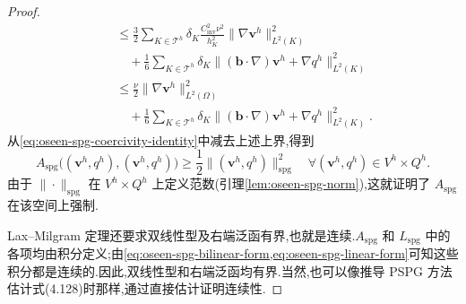 \begin{proof}
\begin{equation}
\begin{aligned}
 &\quad\le \frac{3}{2}\sum_{K\in\mathcal{T}^h}
        \delta_K\frac{C_{\mathrm{inv}}^2\nu^2}{h_K^2}
        \|\nabla\bm{v}^h\|_{L^2(K)}^2\\
 &\qquad+\frac{1}{6}\sum_{K\in\mathcal{T}^h}\delta_K
        \|(\bm{b}\cdot\nabla)\bm{v}^h+\nabla q^h\|_{L^2(K)}^2\\
 &\quad\le \frac{\nu}{2}\|\nabla\bm{v}^h\|_{L^2(\Omega)}^2\\
 &\qquad+\frac{1}{6}\sum_{K\in\mathcal{T}^h}\delta_K
       \|(\bm{b}\cdot\nabla)\bm{v}^h+\nabla q^h\|_{L^2(K)}^2.
\end{aligned}
\end{equation}
从\cref{eq:oseen-spg-coercivity-identity}中减去上述上界,得到
\begin{equation}\label{eq:oseen-spg-coercivity}
 A_{\mathrm{spg}}\bigl((\bm{v}^h,q^h),(\bm{v}^h,q^h)\bigr)
  \ge \frac{1}{2}\|(\bm{v}^h,q^h)\|_{\mathrm{spg}}^2
  \quad\forall(\bm{v}^h,q^h)\in V^h\times Q^h.
\end{equation}
由于 $\|\cdot\|_{\mathrm{spg}}$ 在 $V^h\times Q^h$ 上定义范数(引理\cref{lem:oseen-spg-norm}),这就证明了 $A_{\mathrm{spg}}$ 在该空间上强制.

Lax--Milgram 定理还要求双线性型及右端泛函有界,也就是连续.$A_{\mathrm{spg}}$ 和 $L_{\mathrm{spg}}$ 中的各项均由积分定义;由\cref{eq:oseen-spg-bilinear-form,eq:oseen-spg-linear-form}可知这些积分都是连续的.因此,双线性型和右端泛函均有界.当然,也可以像推导 PSPG 方法估计式(4.128)时那样,通过直接估计证明连续性.
\end{proof}


